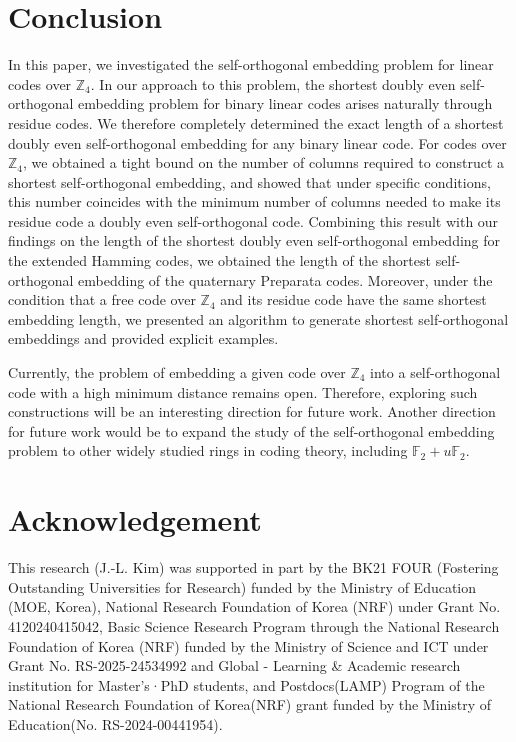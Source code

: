 \documentclass{article}
\theoremstyle{definition}
\theoremstyle{remark}
\begin{document}
\section{Conclusion}
In this paper, we investigated the self-orthogonal embedding problem for linear codes over $\mathbb Z_4$. In our approach to this problem, the shortest doubly even self-orthogonal embedding problem for binary linear codes arises naturally through residue codes. We therefore completely determined the exact length of a shortest doubly even self-orthogonal embedding for any binary linear code. For codes over $\mathbb{Z}_4$, we obtained a tight bound on the number of columns required to construct a shortest self-orthogonal embedding, and showed that under specific conditions, this number coincides with the minimum number of columns needed to make its residue code a doubly even self-orthogonal code. Combining this result with our findings on the length of the shortest doubly even self-orthogonal embedding for the extended Hamming codes, we obtained the length of the shortest self-orthogonal embedding of the quaternary Preparata codes. Moreover, under the condition that a free code over $\mathbb{Z}_4$ and its residue code have the same shortest embedding length, we presented an algorithm to generate shortest self-orthogonal embeddings and provided explicit examples.

Currently, the problem of embedding a given code over $\mathbb{Z}_4$ into a self-orthogonal code with a high minimum distance remains open. Therefore, exploring such constructions will be an interesting direction for future work. Another direction for future work would be to expand the study of the self-orthogonal embedding problem to other widely studied rings in coding theory, including $\mathbb{F}_2 + u\mathbb{F}_2$.
 
\section*{Acknowledgement}
This research (J.-L. Kim) was supported in part by the BK21 FOUR (Fostering Outstanding Universities for Research) funded by the Ministry of Education (MOE, Korea), National Research Foundation of Korea (NRF) under Grant No. 4120240415042, Basic Science Research Program through the National Research Foundation of Korea (NRF) funded by the Ministry of Science and ICT under Grant No. RS-2025-24534992 and Global - Learning \& Academic research institution for Master’s·PhD students, and Postdocs(LAMP) Program of the National Research Foundation of Korea(NRF) grant funded by the Ministry of Education(No. RS-2024-00441954).
\end{document}
